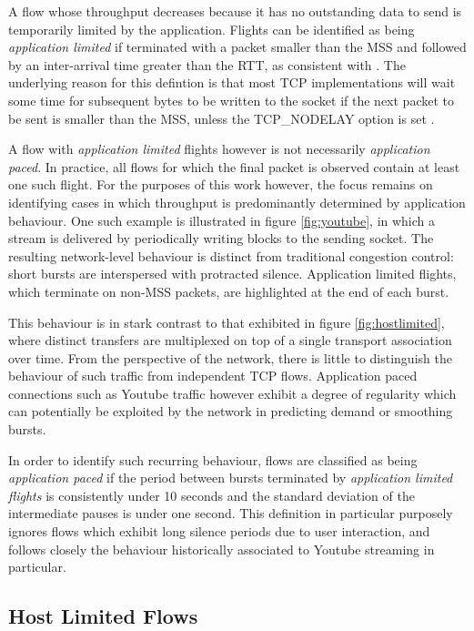 A flow whose throughput decreases because it has no outstanding data to send is temporarily limited by the application. 
Flights can be identified as being \emph{application limited} if terminated with a packet smaller than the \ac{MSS} and followed by an inter-arrival time greater than the \ac{RTT}, as consistent with \cite{Zhang:2002p85}. 
The underlying reason for this defintion is that most \ac{TCP} implementations will wait some time for subsequent bytes to be written to the socket if the next packet to be sent is smaller than the \ac{MSS}, unless the \ac{TCP}\_NODELAY option is set \cite{nagle1984rfc}.

A flow with \emph{application limited} flights however is not necessarily \emph{application paced}. 
In practice, all flows for which the final packet is observed contain at least one such flight.
For the purposes of this work however, the focus remains on identifying cases in which throughput is predominantly determined by application behaviour.
One such example is illustrated in figure \ref{fig:youtube}, in which a stream is delivered by periodically writing blocks to the sending socket.
The resulting network-level behaviour is distinct from traditional congestion control: short bursts are interspersed with protracted silence.
Application limited flights, which terminate on non-\ac{MSS} packets, are highlighted at the end of each burst.

This behaviour is in stark contrast to that exhibited in figure \ref{fig:hostlimited}, where distinct transfers are multiplexed on top of a single transport association over time.
From the perspective of the network, there is little to distinguish the behaviour of such traffic from independent \ac{TCP} flows.
Application paced connections such as Youtube traffic however exhibit a degree of regularity which can potentially be exploited by the network in predicting demand or smoothing bursts.

In order to identify such recurring behaviour, flows are classified as being \emph{application paced} if the period between bursts terminated by \emph{application limited flights} is consistently under 10 seconds and the standard deviation of the intermediate pauses is under one second.
This definition in particular purposely ignores flows which exhibit long silence periods due to user interaction, and follows closely the behaviour historically associated to Youtube streaming in particular.

\subsection{Host Limited Flows}
\label{section:rate:host}

